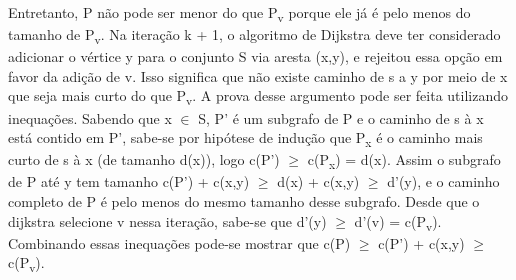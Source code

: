 \documentclass[
	12pt,				%
	oneside,			%
	a4paper,			%
	english,			%
	french,				%
	spanish,			%
	brazil,				%
	]{abntex2}
\begin{document}
Entretanto, \textsf{P} não pode ser menor do que \textsf{P\textsubscript{v}} porque ele já é pelo menos do tamanho de \textsf{P\textsubscript{v}}. Na iteração \textsf{k + 1}, o algoritmo de Dijkstra deve ter considerado adicionar o vértice \textsf{y} para o conjunto \textsf{S} via aresta \textsf{(x,y)}, e rejeitou essa opção em favor da adição de \textsf{v}. Isso significa que não existe caminho de \textsf{s} a \textsf{y} por meio de \textsf{x} que seja mais curto do que \textsf{P\textsubscript{v}}. A prova desse argumento pode ser feita utilizando inequações. Sabendo que \textsf{x $\in$ S}, \textsf{P'} é um subgrafo de \textsf{P} e o caminho de \textsf{s} à \textsf{x} está contido em \textsf{P'}, sabe-se por hipótese de indução que \textsf{P\textsubscript{x}} é o caminho mais curto de \textsf{s} à \textsf{x} (de tamanho \textsf{d(x)}), logo \textsf{c(P') $\ge$ c(P\textsubscript{x}) = d(x)}. Assim o subgrafo de \textsf{P} até \textsf{y} tem tamanho \textsf{c(P') + c(x,y) $\ge$ d(x) + c(x,y) $\ge$ d'(y)}, e o caminho completo de P é pelo menos do mesmo tamanho desse subgrafo. Desde que o dijkstra selecione \textsf{v} nessa iteração, sabe-se que \textsf{d'(y) $\ge$ d'(v) = c(P\textsubscript{v})}. Combinando essas inequações pode-se mostrar que \textsf{c(P) $\ge$ c(P') + c(x,y) $\ge$ c(P\textsubscript{v})}.



\end{document}
